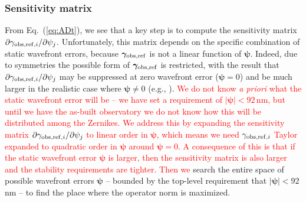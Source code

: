 \documentclass[usenatbib]{mnras}
\newcommand{\changetext}[1]{\textcolor{red}{#1}}
\begin{document}
\subsubsection{Sensitivity matrix}
\label{as:drift-sens}

From Eq.~(\ref{eq:ADt}), we see that a key step is to compute the
sensitivity matrix $\partial \gamma_{{\rm
obs,ref},i}/\partial\psi_j$. Unfortunately, this matrix depends on the
specific combination of static wavefront errors, because
${\boldsymbol\gamma}_{\rm obs,ref}$ is not a linear function of
${\boldsymbol\psi}$. Indeed, due to symmetries the possible form of
${\boldsymbol\gamma}_{\rm obs,ref}$ is restricted, with the result
that $\partial \gamma_{{\rm obs,ref},i}/\partial\psi_j$ may be
suppressed at zero wavefront error (${\boldsymbol\psi}=0$) and be much
larger in the realistic case where ${\boldsymbol\psi}\neq 0$ (e.g., 
\citealt{2010SPIE.7731E..1EN}). 
\changetext{We do not know {\em a priori} what the static wavefront error will be -- we have set a requirement of $|{\boldsymbol\psi}|<92\,$nm, but until we have the as-built observatory we do not know how this will be distributed among the Zernikes. We address this by expanding the sensitivity matrix $\partial \gamma_{{\rm obs,ref},i}/\partial\psi_j$ to linear order in ${\boldsymbol\psi}$, which means we need $\gamma_{{\rm obs,ref},i}$ Taylor expanded to quadratic order in ${\boldsymbol\psi}$ around ${\boldsymbol\psi}=0$. A consequence of this is that if the static wavefront error ${\boldsymbol\psi}$ is larger, then the sensitivity matrix is also larger and the stability requirements are tighter.
Then we} search the
entire space of possible wavefront errors ${\boldsymbol\psi}$ --
bounded by the top-level requirement that $|{\boldsymbol\psi}|<92\,$nm
-- to find the place where the operator norm is maximized.
\end{document}
